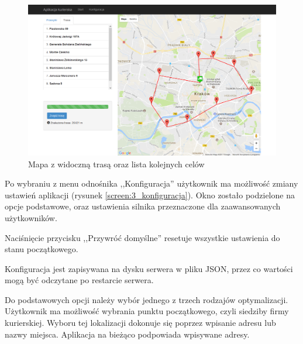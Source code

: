 \begin{figure}
	\centering
	\includegraphics[width=\linewidth]{screen/2_po_wyszukaniu}
	\caption{Mapa z widoczną trasą oraz lista kolejnych celów}
	\label{screen:2_po_wyszukaniu}
\end{figure}

Po wybraniu z menu odnośnika ,,Konfiguracja'' użytkownik ma możliwość zmiany ustawień aplikacji (rysunek \ref{screen:3_konfiguracja}). Okno zostało podzielone na opcje podstawowe, oraz ustawienia silnika przeznaczone dla zaawansowanych użytkowników.

Naciśnięcie przycisku ,,Przywróć domyślne'' resetuje wszystkie ustawienia do stanu początkowego.

Konfiguracja jest zapisywana na dysku serwera w pliku JSON, przez co wartości mogą być odczytane po restarcie serwera.

Do podstawowych opcji należy wybór jednego z trzech rodzajów optymalizacji. Użytkownik ma możliwość wybrania punktu początkowego, czyli siedziby firmy kurierskiej. Wyboru tej lokalizacji dokonuje się poprzez wpisanie adresu lub nazwy miejsca. Aplikacja na bieżąco podpowiada wpisywane adresy.

